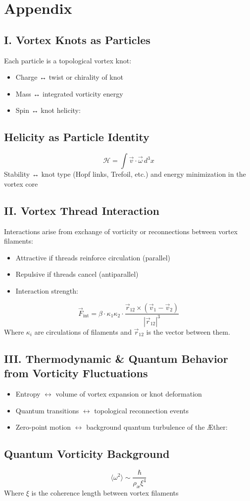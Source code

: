 \section{Appendix}

\subsection*{I. Vortex Knots as Particles}
Each particle is a topological vortex knot:
\begin{itemize}
    \item Charge ↔ twist or chirality of knot
    \item Mass ↔ integrated vorticity energy
    \item Spin ↔ knot helicity:
\end{itemize}
\subsection*{Helicity as Particle Identity}
\begin{equation}
    \mathcal{H} = \int \vec{v} \cdot \vec{\omega} \, d^3x
\end{equation}
Stability ↔ knot type (Hopf links, Trefoil, etc.) and energy minimization in the vortex core

\subsection*{II. Vortex Thread Interaction}
Interactions arise from exchange of vorticity or reconnections between vortex filaments:
\begin{itemize}
    \item Attractive if threads reinforce circulation (parallel)
    \item Repulsive if threads cancel (antiparallel)
    \item Interaction strength:
\end{itemize}
\begin{equation}
    \vec{F}_{\text{int}} = \beta \cdot \kappa_1 \kappa_2 \cdot \frac{\vec{r}_{12} \times (\vec{v}_1 - \vec{v}_2)}{|\vec{r}_{12}|^3}
\end{equation}
Where \(\kappa_i\) are circulations of filaments and \(\vec{r}_{12}\) is the vector between them.


\subsection*{III. Thermodynamic & Quantum Behavior from Vorticity Fluctuations}
\begin{itemize}
    \item Entropy \(\leftrightarrow\) volume of vortex expansion or knot deformation
    \item Quantum transitions \(\leftrightarrow\) topological reconnection events
    \item Zero-point motion \(\leftrightarrow\) background quantum turbulence of the Æther:
\end{itemize}
\subsection*{Quantum Vorticity Background}
\begin{equation}
    \langle \omega^2 \rangle \sim \frac{\hbar}{\rho_\text{æ} \xi^4}
\end{equation}
Where \(\xi\) is the coherence length between vortex filaments
